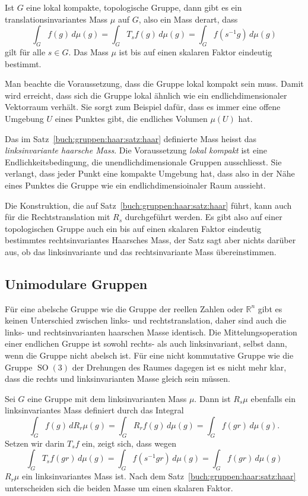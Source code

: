 \begin{satz}[Haar]
\label{buch:gruppen:haar:satz:haar}
Ist $G$ eine lokal kompakte, topologische Gruppe, dann gibt es ein
translationsinvariantes Mass $\mu$ auf $G$, also ein Mass derart,
dass 
\[
\int_G f(g)\,d\mu(g)
=
\int_G T_sf(g)\,d\mu(g)
=
\int_G f(s^{-1}g)\,d\mu(g)
\]
gilt für alle $s\in G$.
Das Mass $\mu$ ist bis auf einen skalaren Faktor eindeutig bestimmt.
\end{satz}

Man beachte die Voraussetzung, dass die Gruppe lokal kompakt sein
muss.
Damit wird erreicht, dass sich die Gruppe lokal ähnlich wie ein
endlichdimensionaler Vektorraum verhält.
Sie sorgt zum Beispiel dafür, dass es immer eine offene Umgebung
$U$ eines Punktes gibt, die endliches Volumen $\mu(U)$ hat.

Das im Satz~\ref{buch:gruppen:haar:satz:haar} definierte Mass
heisst das {\em linksinvariante haarsche Mass}.
Die Voraussetzung {\em lokal kompakt} ist eine Endlichkeitsbedingung,
die unendlichdimensionale Gruppen ausschliesst.
Sie verlangt, dass jeder Punkt eine kompakte Umgebung hat, dass also
in der Nähe eines Punktes die Gruppe wie ein endlichdimensioinaler 
Raum aussieht.

Die Konstruktion, die auf Satz~\ref{buch:gruppen:haar:satz:haar}
führt, kann auch für die Rechtstranslation mit $R_s$ durchgeführt
werden.
Es gibt also auf einer topologischen Gruppe auch ein bis auf einen
skalaren Faktor eindeutig bestimmtes rechtsinvariantes Haarsches Mass,
der Satz sagt aber nichts darüber aus, ob das linksinvariante und das
rechtsinvariante Mass übereinstimmen.

%
%
\subsection{Unimodulare Gruppen
\label{buch:haar:subsection:unimodular}}
Für eine abelsche Gruppe wie die Gruppe der reellen Zahlen
oder $\mathbb{R}^n$ gibt es keinen Unterschied zwischen links- und
rechtstranslation, daher sind auch die links- und rechtsinvarianten
haarschen Masse identisch.
Die Mittelungsoperation einer endlichen Gruppe ist sowohl rechts-
als auch linksinvariant, selbst dann, wenn die Gruppe nicht abelsch
ist.
Für eine nicht kommutative Gruppe wie die Gruppe $\operatorname{SO}(3)$
der Drehungen des Raumes dagegen ist es nicht mehr klar, dass 
die rechts und linksinvarianten Masse gleich sein müssen.

Sei $G$ eine Gruppe mit dem linksinvarianten Mass $\mu$.
Dann ist $R_s\mu$ ebenfalls ein linksinvariantes Mass definiert
durch das Integral
\[
\int_G f(g) \, dR_r\mu(g)
=
\int_G R_rf(g) \,d\mu(g)
=
\int_G f(gr)\,d\mu(g).
\]
Setzen wir darin $T_sf$ ein, zeigt sich, dass wegen
\[
\int_G T_sf(gr)\,d\mu(g)
=
\int_G f(s^{-1}gr)\,d\mu(g)
=
\int_G f(gr)\,d\mu(g)
\]
$R_r\mu$ ein linksinvariantes Mass ist.
Nach dem Satz~\ref{buch:gruppen:haar:satz:haar} unterscheiden sich
die beiden Masse um einen skalaren Faktor.


